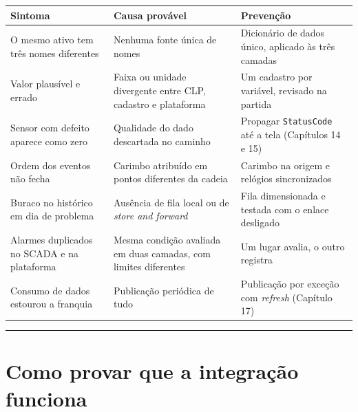 \begin{longtable}[]{@{}
  >{\raggedright\arraybackslash}p{}
  >{\raggedright\arraybackslash}p{}
  >{\raggedright\arraybackslash}p{}@{}}
\toprule\noalign{}
\begin{minipage}[b]{\linewidth}\raggedright
Sintoma
\end{minipage} & \begin{minipage}[b]{\linewidth}\raggedright
Causa provável
\end{minipage} & \begin{minipage}[b]{\linewidth}\raggedright
Prevenção
\end{minipage} \\
\midrule\noalign{}
\endhead
\bottomrule\noalign{}
\endlastfoot
O mesmo ativo tem três nomes diferentes & Nenhuma fonte única de nomes & Dicionário de dados único, aplicado às três camadas \\
Valor plausível e errado & Faixa ou unidade divergente entre CLP, cadastro e plataforma & Um cadastro por variável, revisado na partida \\
Sensor com defeito aparece como zero & Qualidade do dado descartada no caminho & Propagar \passthrough{\lstinline!StatusCode!} até a tela (Capítulos 14 e 15) \\
Ordem dos eventos não fecha & Carimbo atribuído em pontos diferentes da cadeia & Carimbo na origem e relógios sincronizados \\
Buraco no histórico em dia de problema & Ausência de fila local ou de \emph{store and forward} & Fila dimensionada e testada com o enlace desligado \\
Alarmes duplicados no SCADA e na plataforma & Mesma condição avaliada em duas camadas, com limites diferentes & Um lugar avalia, o outro registra \\
Consumo de dados estourou a franquia & Publicação periódica de tudo & Publicação por exceção com \emph{refresh} (Capítulo 17) \\
\end{longtable}

\begin{center}\rule{0.5\linewidth}{0.5pt}\end{center}

\section{Como provar que a integração funciona}\label{como-provar-que-a-integrauxe7uxe3o-funciona}

